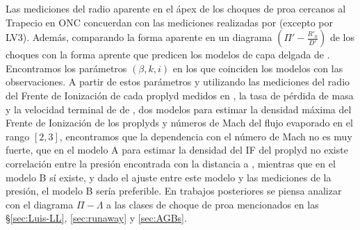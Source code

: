 Las mediciones del radio aparente en el ápex de los choques de proa cercanos al Trapecio en ONC concuerdan con las mediciones realizadas por \citet{Robberto:2005} (excepto por LV3). Además, comparando la forma aparente en un diagrama $(\Pi'-\frac{R'_0}{D'})$ de los choques con la forma aprente que predicen los modelos de capa delgada de \CRW{}. Encontramos los parámetros $(\beta, k, i)$ en los que coinciden los modelos con las observaciones. A partir de estos parámetros y utilizando las mediciones del radio del Frente de Ionización de cada proplyd medidos en \citet{HA:1998}, la tasa de pérdida de masa y la velocidad terminal de \thC{} de \citet{Gagne:2005}, dos modelos para estimar la densidad máxima del Frente de Ionización de los proplyds y números de Mach del flujo evaporado en el rango $[2, 3]$, encontramos que la dependencia con el número de Mach no es muy fuerte, que en el modelo A para estimar la densidad del IF del proplyd no existe correlación entre la presión encontrada con la distancia a \thC{}, mientras que en el modelo B sí existe, y dado el ajuste entre este modelo y las mediciones de la presión, el modelo B sería preferible. En trabajos posteriores se piensa analizar con el diagrama $\Pi-\Lambda$ a las clases de choque de proa mencionados en las \S \ref{sec:Luis-LL}, \ref{sec:runaway} y \ref{sec:AGBs}.